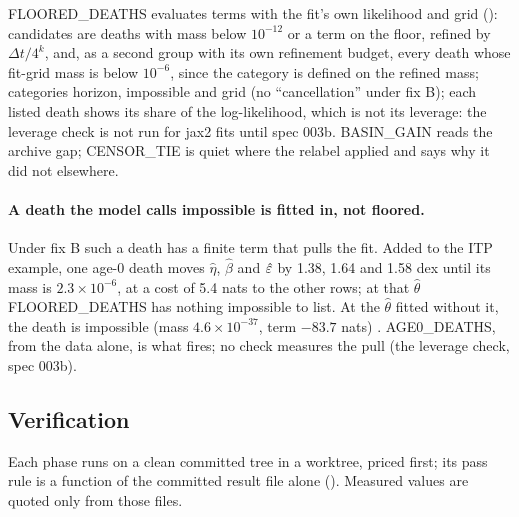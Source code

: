 FLOORED\_DEATHS evaluates terms with the fit's own likelihood and grid (): candidates are
deaths with mass below $10^{-12}$ or a term on the floor, refined by $\Delta t/4^k$, and, as a second group with its
own refinement budget, every death whose fit-grid mass is below $10^{-6}$, since the category is defined on the
refined mass; categories horizon, impossible and grid (no ``cancellation'' under fix B); each listed death shows its
share of the log-likelihood, which is not its leverage: the leverage check is not run for jax2 fits until spec 003b. BASIN\_GAIN reads
the archive gap; CENSOR\_TIE is quiet where the relabel applied and says why it did not elsewhere.

\paragraph{A death the model calls impossible is fitted in, not floored.} Under fix B such a death has a finite term
that pulls the fit. Added to the ITP example, one age-0 death moves $\hat\eta$, $\hat\beta$ and $\hat{\varepsilon}$ by 1.38,
1.64 and 1.58 dex until its mass is $2.3\times10^{-6}$, at a cost of 5.4 nats to the other rows; at that $\hat\theta$
FLOORED\_DEATHS has nothing impossible to list. At the $\hat\theta$ fitted without it, the death is impossible (mass
$4.6\times10^{-37}$, term $-83.7$ nats) . AGE0\_DEATHS, from the data
alone, is what fires; no check measures the pull (the leverage check, spec 003b).

\subsection{Verification}\label{sec:pj-verify}

Each phase runs on a clean committed tree in a worktree, priced first; its pass rule is a function of the committed
result file alone (). Measured values are quoted only from those files.


